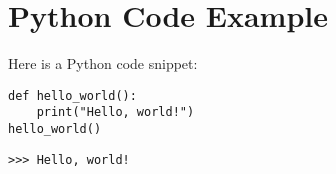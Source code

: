 \documentclass{article}
\begin{document}
\section{Python Code Example}

Here is a Python code snippet:

\begin{verbatim}
def hello_world():
    print("Hello, world!")
hello_world()
\end{verbatim}

\begin{verbatim}
>>> Hello, world!
\end{verbatim}
    
\end{document}
